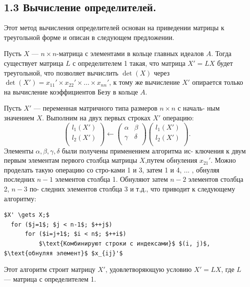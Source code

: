 \documentclass{mai_book}
\begin{document}
\subsection{1.3 Вычисление определителей.}
Этот метод вычисления определителей основан на приведении матрицы \linebreak к треугольной форме и описан в следующем предложении.  
\begin{predl} 
Пусть $X$ --- $n \times n$-матрица с элементами в кольце главных идеалов \linebreak $A$. Тогда существует матрица $L$ с определителем 1 такая, что матрица \linebreak $X' = LX$ будет треугольной, что позволяет вычислить $\det(X)$ через \linebreak $\det(X') = {x_{11}}' \times {x_{22}}' \times ... \times {x_{nn}}' $, к тому же вычисление $X'$ опирается  \linebreak только на вычисление коэффициентов Безу в кольце $A$.
\end{predl}
\begin{myproof}
Пусть $X'$ --- переменная матричного типа размеров $n \times n$ с началь- \linebreak ным значением $X$. Выполним на двух первых строках $X'$ операцию:  
$${\left( \begin{array}{ccc}
l_1(X') \\
l_2(X') \\
\end{array} \right)}\gets {\left( \begin{array}{ccc}
\alpha & \beta \\
\gamma & \delta \\
\end{array} \right)}{\left( \begin{array}{ccc}
l_1(X') \\
l_2(X') \\
\end{array} \right)}.$$
\newpage
\noindent Элементы $\alpha, \beta, \gamma, \delta$ были получены применением алгоритма ис- \linebreak ключения к двум первым элементам первого столбца матрицы $X$,\linebreak путем обнуления ${x_{21}}'$. Можно проделать такую операцию со стро-\linebreak ками 1 и 3, затем 1 и 4, ... , обнуляя последних $n - 1$ элементов \linebreak столбца 1. Обнуляют затем $n - 2$ элементов столбца 2, $n - 3$ по- \linebreak следних элементов столбца 3 и т.д., что приводит к следующему \linebreak алгоритму:  
\begin{lstlisting}[mathescape=true]
  $X' \gets X;$
  for ($j=1$; $j < n-1$; $++j$) 
      for ($i=j+1$; $i < n$; $++i$)  
          $\text{Комбинируют строки с индексами}$ $(i, j)$, $\text{обнуляя элемент}$ $x_{ij}'$
\end{lstlisting}
Этот алгоритм строит матрицу $X'$, удовлетворяющую условию $X' = LX$, где $L$ --- матрица с определителем 1.
\end{myproof}
\end{document}

